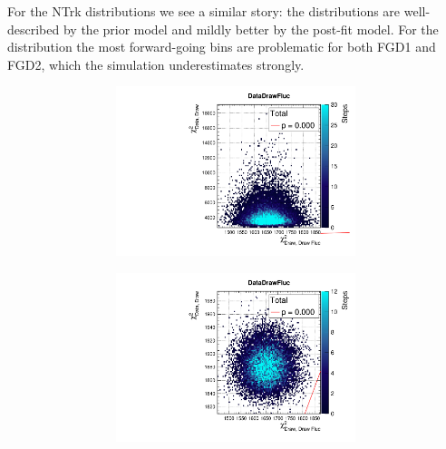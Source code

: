 For the NTrk distributions we see a similar story: the \pmu distributions are well-described by the prior model and mildly better by the post-fit model. For the \cosmu distribution the most forward-going bins are problematic for both FGD1 and FGD2, which the simulation underestimates strongly.
\begin{figure}[h]
	\begin{subfigure}[t]{\textwidth}
	\begin{subfigure}[t]{0.24\textwidth}
		\includegraphics[width=\textwidth, trim={0mm 0mm 0mm 8mm}, clip,page=100]{figures/mach3/data/priorpred/2017b_NewDet_3Xsec_4Det_5Flux_NewXSecTune_Data_merge_PriorPred_procs}
	\end{subfigure}
	\begin{subfigure}[t]{0.24\textwidth}
		\includegraphics[width=\textwidth, trim={0mm 0mm 0mm 8mm}, clip,page=100]{figures/mach3/data/postpred/2017b_NewData_NewDet_UpdXsecStep_2Xsec_4Det_5Flux_0_PostPred_procs}

\end{subfigure}
\end{subfigure}
\end{figure}
